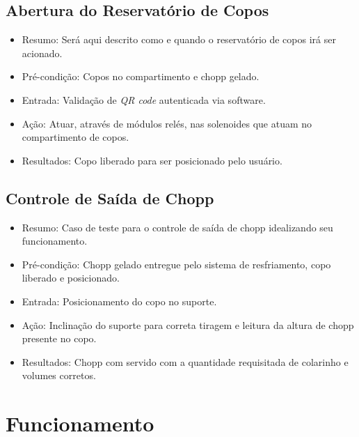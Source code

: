 \subsection{Abertura do Reservatório de Copos}

\begin{itemize}

    \item Resumo: Será aqui descrito como e quando o reservatório de copos irá ser acionado. 

    \item Pré-condição: Copos no compartimento e chopp gelado.

    \item Entrada: Validação de \textit{QR code} autenticada via software.

    \item Ação: Atuar, através de módulos relés, nas solenoides que atuam no compartimento de copos.

    \item Resultados: Copo liberado para ser posicionado pelo usuário.

\end{itemize}        


\subsection{Controle de Saída de Chopp}

\begin{itemize}

    \item Resumo: Caso de teste para o controle de saída de chopp idealizando seu funcionamento. 

    \item Pré-condição: Chopp gelado entregue pelo sistema de resfriamento, copo liberado e posicionado.

    \item Entrada: Posicionamento do copo no suporte.

    \item Ação: Inclinação do suporte para correta tiragem e leitura da altura de chopp presente no copo.

    \item Resultados: Chopp com servido com a quantidade requisitada de colarinho e volumes corretos.

\end{itemize}        

\section{Funcionamento}

